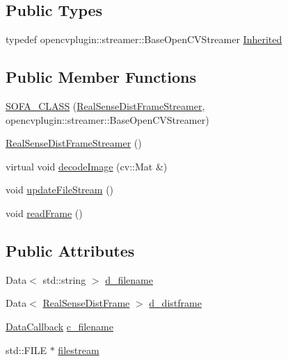\subsection*{Public Types}
\begin{DoxyCompactItemize}
\item 
typedef opencvplugin\+::streamer\+::\+Base\+Open\+C\+V\+Streamer \hyperlink{classsofa_1_1rgbdtracking_1_1_real_sense_dist_frame_streamer_afa7e78c7718a4c9284e392e8b5ef8a0a}{Inherited}
\end{DoxyCompactItemize}
\subsection*{Public Member Functions}
\begin{DoxyCompactItemize}
\item 
\hyperlink{classsofa_1_1rgbdtracking_1_1_real_sense_dist_frame_streamer_af6c388f58476267cf55047f977ba3b39}{S\+O\+F\+A\+\_\+\+C\+L\+A\+SS} (\hyperlink{classsofa_1_1rgbdtracking_1_1_real_sense_dist_frame_streamer}{Real\+Sense\+Dist\+Frame\+Streamer}, opencvplugin\+::streamer\+::\+Base\+Open\+C\+V\+Streamer)
\item 
\hyperlink{classsofa_1_1rgbdtracking_1_1_real_sense_dist_frame_streamer_a0da55991001c08a5181d3c4aaae7c93c}{Real\+Sense\+Dist\+Frame\+Streamer} ()
\item 
virtual void \hyperlink{classsofa_1_1rgbdtracking_1_1_real_sense_dist_frame_streamer_acf9a105d197775cc56c840dce6edfb31}{decode\+Image} (cv\+::\+Mat \&)
\item 
void \hyperlink{classsofa_1_1rgbdtracking_1_1_real_sense_dist_frame_streamer_a0d02debb133e08b79d32eecb56969ab4}{update\+File\+Stream} ()
\item 
void \hyperlink{classsofa_1_1rgbdtracking_1_1_real_sense_dist_frame_streamer_a01d82d0618162c79579ef1ddeec97872}{read\+Frame} ()
\end{DoxyCompactItemize}
\subsection*{Public Attributes}
\begin{DoxyCompactItemize}
\item 
Data$<$ std\+::string $>$ \hyperlink{classsofa_1_1rgbdtracking_1_1_real_sense_dist_frame_streamer_a66a7c3a880c2114197e3c476c5bbfbed}{d\+\_\+filename}
\item 
Data$<$ \hyperlink{classsofa_1_1rgbdtracking_1_1_real_sense_dist_frame}{Real\+Sense\+Dist\+Frame} $>$ \hyperlink{classsofa_1_1rgbdtracking_1_1_real_sense_dist_frame_streamer_acab30219890af914a1a0d200a9af16a5}{d\+\_\+distframe}
\item 
\hyperlink{namespacesofa_1_1rgbdtracking_a00834a9204a667746fef9a402ccbfb55}{Data\+Callback} \hyperlink{classsofa_1_1rgbdtracking_1_1_real_sense_dist_frame_streamer_ad5d699dd44589bb16c5560fb1bdbb661}{c\+\_\+filename}
\item 
std\+::\+F\+I\+LE $\ast$ \hyperlink{classsofa_1_1rgbdtracking_1_1_real_sense_dist_frame_streamer_a6a62882f02e60b44fc462dd7bdd893ea}{filestream}
\end{DoxyCompactItemize}


